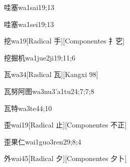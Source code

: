 
\begin{verbete}{哇塞}{wa1sai1}{9;13}
\end{verbete}

\begin{verbete}{哇塞}{wa1sei1}{9;13}
\end{verbete}

\begin{verbete}{挖}{wa1}{9}[Radical 手][Componentes 扌穵]
\end{verbete}

\begin{verbete}{挖掘机}{wa1jue2ji1}{9;11;6}
\end{verbete}

\begin{verbete}{瓦}{wa3}{4}[Radical 瓦][Kangxi 98]
\end{verbete}

\begin{verbete}{瓦努阿图}{wa3nu3'a1tu2}{4;7;7;8}
\end{verbete}

\begin{verbete}{瓦特}{wa3te4}{4;10}
\end{verbete}

\begin{verbete}{歪}{wai1}{9}[Radical 止][Componentes 不正]
\end{verbete}

\begin{verbete}{歪果仁}{wai1guo3ren2}{9;8;4}
\end{verbete}

\begin{verbete}{外}{wai4}{5}[Radical 夕][Componentes 夕卜]
\end{verbete}

